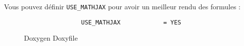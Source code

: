 		Vous pouvez définir  \verb+USE_MATHJAX+ pour avoir un meilleur rendu des formules :

		\begin{figure}[H]
			\begin{changemargin}{-2.5cm}{-2.5cm}
			\begin{tcolorbox}
			\begin{verbatim}
				USE_MATHJAX            = YES
			\end{verbatim}
			\end{tcolorbox}
			\end{changemargin}
			\caption{Doxygen Doxyfile}
		\end{figure}
